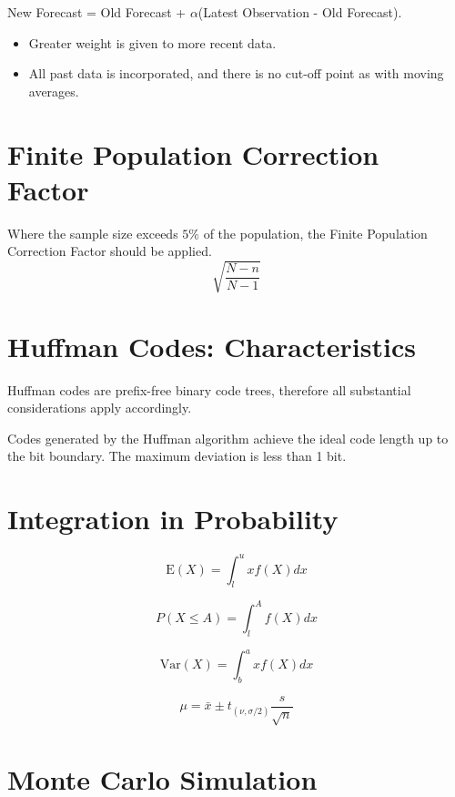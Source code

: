 \begin{enumerate}
New Forecast = Old Forecast + $\alpha$(Latest Observation - Old Forecast).

\begin{itemize}
	\item Greater weight is given to more recent data.
	\item All past data is incorporated, and there is no cut-off point as with moving averages.
\end{itemize}




\section{Finite Population Correction Factor}
Where the sample size exceeds $5\%$ of the population, the Finite Population Correction Factor should be applied.
\[ \sqrt{\frac{N-n}{N-1}} \]


\section{Huffman Codes: Characteristics}

Huffman codes are prefix-free binary code trees, therefore all substantial considerations apply accordingly.

Codes generated by the Huffman algorithm achieve the ideal code length up to the bit boundary.
The maximum deviation is less than 1 bit.
\section{Integration in Probability}

\[ \mbox{E}(X) = \int^{u}_{l} x f(X) dx \]

\[ P(X \leq A)  = \int^{A}_{l} f(X) dx \]

\[ \mbox{Var}(X) = \int^{a}_{b} x f(X) dx \]


\[ \mu = \bar{x} \pm t_{(\nu,\sigma/2)}\frac{s}{\sqrt{n}}  \]




\section{Monte Carlo Simulation}


\end{enumerate}
